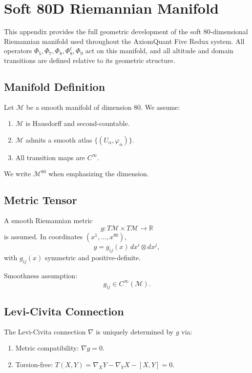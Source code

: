 \section{Soft 80D Riemannian Manifold}
\label{sec:manifold}

This appendix provides the full geometric development of the soft
80-dimensional Riemannian manifold used throughout the AxiomQuant Five Redux
system. All operators $\Phi_5, \Phi_7, \Phi_8, \Phi_8^t, \Phi_9$ act on this
manifold, and all altitude and domain transitions are defined relative to its
geometric structure.

\subsection{Manifold Definition}

Let $\mathcal{M}$ be a smooth manifold of dimension $80$. We assume:

\begin{enumerate}
    \item $\mathcal{M}$ is Hausdorff and second-countable.
    \item $\mathcal{M}$ admits a smooth atlas $\{(U_\alpha, \varphi_\alpha)\}$.
    \item All transition maps are $C^\infty$.
\end{enumerate}

We write $\mathcal{M}^{80}$ when emphasizing the dimension.

\subsection{Metric Tensor}

A smooth Riemannian metric
\[
g : T\mathcal{M} \times T\mathcal{M} \to \mathbb{R}
\]
is assumed. In coordinates $(x^1,\dots,x^{80})$,
\[
g = g_{ij}(x)\, dx^i \otimes dx^j,
\]
with $g_{ij}(x)$ symmetric and positive-definite.

Smoothness assumption:
\[
g_{ij} \in C^\infty(\mathcal{M}).
\]

\subsection{Levi-Civita Connection}

The Levi-Civita connection $\nabla$ is uniquely determined by $g$ via:

\begin{enumerate}
    \item Metric compatibility: $\nabla g = 0$.
    \item Torsion-free: $T(X,Y) = \nabla_X Y - \nabla_Y X - [X,Y] = 0$.
\end{enumerate}

